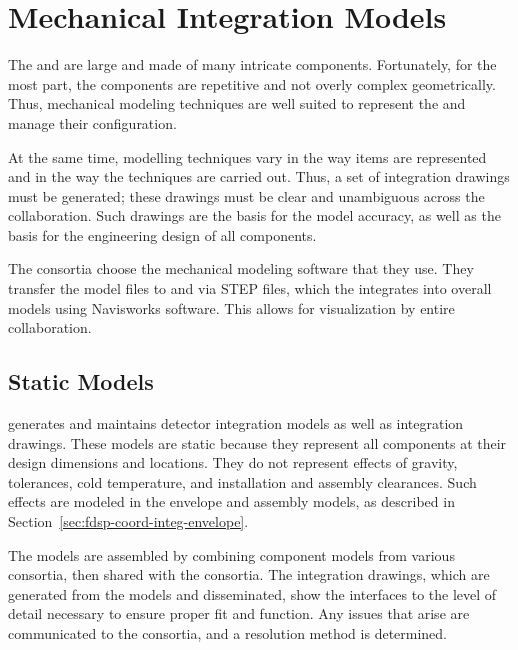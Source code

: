 \section{Mechanical Integration Models}
\label{sec:fdsp-coord-integ-models}

The  and   are large and made of many
intricate components. Fortunately, for the most part, the
components are repetitive and not overly complex
geometrically. Thus, \threed mechanical modeling techniques are well suited
to represent the  and manage their configuration.

At the same time, \threed modelling techniques vary in the way items are
represented and in the way the techniques are carried out. Thus, a set
of \twod integration drawings must be generated; these drawings must be
clear and unambiguous across the collaboration. Such \twod drawings are
the basis for the \threed model accuracy, as well as the basis for the engineering
design of all components.

The consortia choose the  mechanical modeling software that they use. %
They transfer the model files %
to  and 
via STEP files, which the %
 integrates  into overall models
using Navisworks software. This allows for visualization by entire
collaboration.

\subsection{Static Models}
\label{sec:fdsp-coord-integ-static}

 generates and maintains \threed detector integration models as
well as \twod integration drawings. These models are static because they
represent all components at their design dimensions and
locations. They do not represent effects of gravity, tolerances, cold
temperature, and installation and assembly clearances. Such effects are
modeled in the envelope and assembly models, as described in Section~\ref{sec:fdsp-coord-integ-envelope}. %


The \threed models are assembled by combining component models from various
consortia, %
then shared with the consortia. The \twod integration drawings, which are generated from
the \threed models and disseminated, show the interfaces to the level of
detail necessary to ensure proper fit and function. Any issues that
arise are communicated to the consortia, and a resolution method is
determined. 

